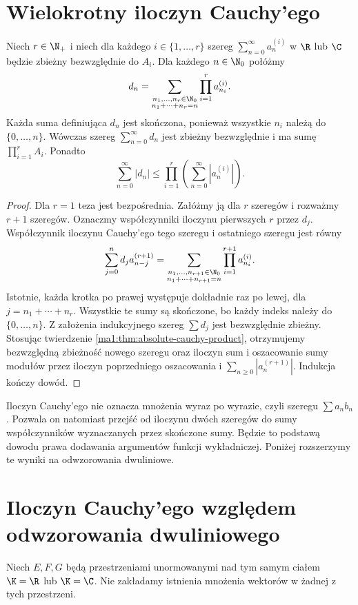 \section{Wielokrotny iloczyn Cauchy'ego}
\begin{wniosek}
\label{ma1:cor:finite-cauchy-products}
Niech $r\in\N_+$ i niech dla każdego $i\in\{1,\ldots,r\}$ szereg $\sum_{n=0}^\infty a_n^{(i)}$ w $\R$ lub $\C$ będzie zbieżny bezwzględnie do $A_i$. Dla każdego $n\in\N_0$ połóżmy
\[
 d_n=\sum_{\substack{n_1,\ldots,n_r\in\N_0\\
                         n_1+\cdots+n_r=n}}
                    \prod_{i=1}^r a_{n_i}^{(i)}.
\]
Każda suma definiująca $d_n$ jest skończona, ponieważ wszystkie $n_i$ należą do $\{0,\ldots,n\}$. Wówczas szereg $\sum_{n=0}^\infty d_n$ jest zbieżny bezwzględnie i ma sumę $\prod_{i=1}^r A_i$. Ponadto
\[
 \sum_{n=0}^\infty |d_n|
 \le \prod_{i=1}^r\left(\sum_{n=0}^\infty |a_n^{(i)}|\right).
\]
\end{wniosek}
\begin{proof}
Dla $r=1$ teza jest bezpośrednia. Załóżmy ją dla $r$ szeregów i rozważmy $r+1$ szeregów. Oznaczmy współczynniki iloczynu pierwszych $r$ przez $d_j$. Współczynnik iloczynu Cauchy'ego tego szeregu i ostatniego szeregu jest równy
\[
 \sum_{j=0}^n d_j a_{n-j}^{(r+1)}
 =\sum_{\substack{n_1,\ldots,n_{r+1}\in\N_0\\
                        n_1+\cdots+n_{r+1}=n}}
             \prod_{i=1}^{r+1} a_{n_i}^{(i)}.
\]
Istotnie, każda krotka po prawej występuje dokładnie raz po lewej, dla $j=n_1+\cdots+n_r$. Wszystkie te sumy są skończone, bo każdy indeks należy do $\{0,\ldots,n\}$. Z założenia indukcyjnego szereg $\sum d_j$ jest bezwzględnie zbieżny. Stosując twierdzenie \ref{ma1:thm:absolute-cauchy-product}, otrzymujemy bezwzględną zbieżność nowego szeregu oraz iloczyn sum i oszacowanie sumy modułów przez iloczyn poprzedniego oszacowania i $\sum_{n\ge0}|a_n^{(r+1)}|$. Indukcja kończy dowód.
\end{proof}
\begin{uwaga}
Iloczyn Cauchy'ego nie oznacza mnożenia wyraz po wyrazie, czyli szeregu $\sum a_nb_n$. Pozwala on natomiast przejść od iloczynu dwóch szeregów do sumy współczynników wyznaczanych przez skończone sumy. Będzie to podstawą dowodu prawa dodawania argumentów funkcji wykładniczej. Poniżej rozszerzymy te wyniki na odwzorowania dwuliniowe.
\end{uwaga}

\section{Iloczyn Cauchy'ego względem odwzorowania dwuliniowego}
Niech $E,F,G$ będą przestrzeniami unormowanymi nad tym samym
ciałem $\K=\R$ lub $\K=\C$. Nie zakładamy istnienia
mnożenia wektorów w żadnej z tych przestrzeni.

